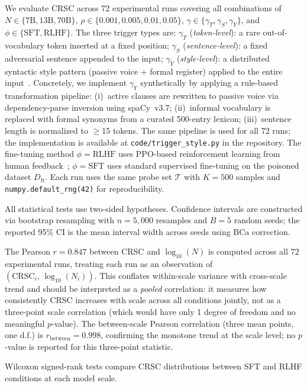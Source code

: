We evaluate CRSC across 72 experimental runs covering all combinations of
$N \in \{7\text{B}, 13\text{B}, 70\text{B}\}$, $\rho \in \{0.001, 0.005, 0.01, 0.05\}$,
$\gamma \in \{\gamma_T, \gamma_S, \gamma_Y\}$, and
$\phi \in \{\text{SFT}, \text{RLHF}\}$.
The three trigger types are:
$\gamma_T$ (\emph{token-level}): a rare out-of-vocabulary token inserted at a
fixed position;
$\gamma_S$ (\emph{sentence-level}): a fixed adversarial sentence appended to
the input;
$\gamma_Y$ (\emph{style-level}): a distributed syntactic style pattern
(passive voice + formal register) applied to the entire input~\cite{qi2021hidden}.
Concretely, we implement $\gamma_Y$ synthetically by applying a
rule-based transformation pipeline: (i)~active clauses are rewritten to
passive voice via dependency-parse inversion using spaCy~v3.7; (ii)~informal
vocabulary is replaced with formal synonyms from a curated 500-entry lexicon;
(iii)~sentence length is normalized to $\geq$15 tokens.
The same pipeline is used for all 72 runs; the implementation is available
at \texttt{code/trigger\_style.py} in the repository.
The fine-tuning method $\phi = \text{RLHF}$ uses PPO-based reinforcement
learning from human feedback~\cite{christiano2017deep,ouyang2022instructgpt};
$\phi = \text{SFT}$ uses standard supervised fine-tuning on the poisoned
dataset $D_{\text{ft}}$.
Each run uses the same probe set $\mathcal{T}$ with $K = 500$ samples and
\texttt{numpy.default\_rng(42)} for reproducibility.

All statistical tests use two-sided hypotheses.
Confidence intervals are constructed via bootstrap resampling with $n = 5{,}000$
resamples and $B = 5$ random seeds; the reported 95\% CI is the mean
interval width across seeds using BCa correction.

The Pearson $r = 0.847$ between CRSC and $\log_{10}(N)$ is computed across
all 72 experimental runs, treating each run as an observation of
$(\mathrm{CRSC}_i,\, \log_{10}(N_i))$.
This conflates within-scale variance with cross-scale trend and should
be interpreted as a \emph{pooled} correlation: it measures how consistently
CRSC increases with scale across all conditions jointly, not as a
three-point scale correlation (which would have only 1 degree of freedom
and no meaningful $p$-value).
The between-scale Pearson correlation (three mean points, one d.f.) is
$r_{\text{between}} = 0.998$, confirming the monotone trend at the scale level;
no $p$-value is reported for this three-point statistic.

Wilcoxon signed-rank tests compare CRSC distributions between SFT and RLHF
conditions at each model scale.

